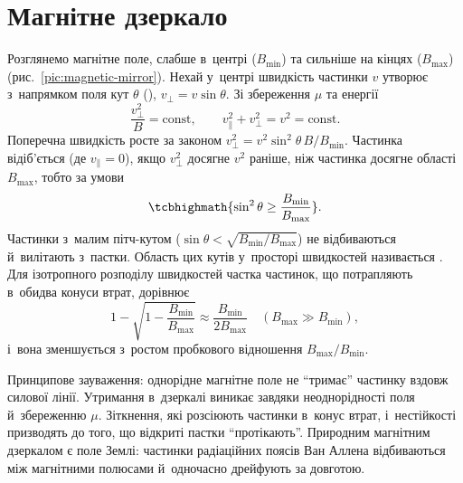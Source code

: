 


\section{Магнітне дзеркало}



Розглянемо магнітне поле, слабше в~центрі ($B_{\min}$) та сильніше на кінцях ($B_{\max}$)
(рис.~\ref{pic:magnetic-mirror}). Нехай у~центрі швидкість частинки $v$ утворює
з~напрямком поля кут $\theta$ (), $v_\perp=v\sin\theta$. Зі збереження
$\mu$ та енергії
\begin{equation*}
	\frac{v_\perp^2}{B}=\mathrm{const},\qquad v_\parallel^2+v_\perp^2=v^2=\mathrm{const}.
\end{equation*}
Поперечна швидкість росте за законом $v_\perp^2=v^2\sin^2\theta\,B/B_{\min}$. Частинка
відіб'ється (де $v_\parallel=0$), якщо $v_\perp^2$ досягне $v^2$ раніше, ніж частинка
досягне області $B_{\max}$, тобто за умови
\begin{equation}\label{eq:mirror-condition}
	\tcbhighmath{\sin^2\theta\geq\frac{B_{\min}}{B_{\max}}}.
\end{equation}
Частинки з~малим пітч-кутом ($\sin\theta<\sqrt{B_{\min}/B_{\max}}$) не відбиваються
й~вилітають з~пастки. Область цих кутів у~просторі швидкостей називається . Для ізотропного розподілу швидкостей частка частинок, що потрапляють в~обидва
конуси втрат, дорівнює
\begin{equation*}
	1-\sqrt{1-\frac{B_{\min}}{B_{\max}}}\approx\frac{B_{\min}}{2B_{\max}}\quad(B_{\max}\gg B_{\min}),
\end{equation*}
і~вона зменшується з~ростом пробкового відношення $B_{\max}/B_{\min}$.

Принципове зауваження: однорідне магнітне поле не \enquote{тримає} частинку вздовж силової
лінії. Утримання в~дзеркалі виникає завдяки неоднорідності поля й~збереженню $\mu$.
Зіткнення, які розсіюють частинки в~конус втрат, і~нестійкості призводять до того, що
відкриті пастки \enquote{протікають}. Природним магнітним дзеркалом є поле Землі: частинки
радіаційних поясів Ван Аллена відбиваються між магнітними полюсами й~одночасно дрейфують
за довготою.

